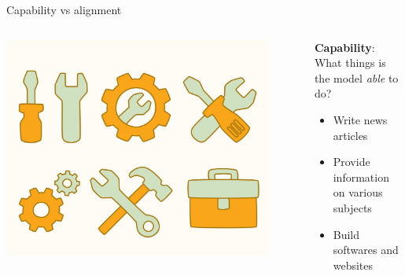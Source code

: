 \documentclass[usenames,dvipsnames,notes,11pt,aspectratio=169,hyperref={colorlinks=true, linkcolor=blue}]{beamer}
\begin{document}
\begin{frame}
    {Capability vs alignment}

    \vspace{1em}
        \begin{columns}
        \begin{column}{0.3\textwidth}
        \includegraphics[width=0.9\textwidth]{figures/tools}
        \end{column}
        \begin{column}{0.7\textwidth}
    \textbf{Capability}: What things is the model \emph{able} to do?\\
    \begin{itemize}
        \item Write news articles
        \item Provide information on various subjects
        \item Build softwares and websites
    \end{itemize}
        \end{column}
        \end{columns}


\end{frame}
\end{document}
